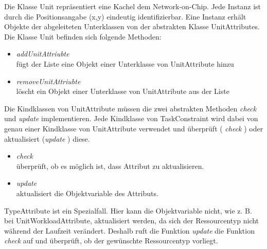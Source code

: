 Die Klasse Unit repräsentiert eine Kachel dem Network-on-Chip. Jede Instanz ist durch die Positionsangabe (x,y) eindeutig identifizierbar. Eine Instanz erhält Objekte der abgeleiteten Unterklassen von der abstrakten Klasse UnitAttributes. Die Klasse Unit befinden sich folgende Methoden:
\begin{itemize}
\item \textit{addUnitAttriubte}\\
fügt der Liste eine Objekt einer Unterklasse von UnitAttribute hinzu
\item \textit{removeUnitAttriubte}\\
löscht ein Objekt einer Unterklasse von UnitAttribute aus der Liste
\end{itemize}

Die Kindklassen von UnitAttribute müssen die zwei abstrakten Methoden \textit{check} und \textit{update} implementieren. Jede Kindklasse von TaskConstraint wird dabei von genau einer Kindklasse von UnitAttribute verwendet und überprüft ( \textit{check} ) oder aktualisiert (\textit{update} ) diese.

\begin{itemize}
\item \textit{check}\\
überprüft, ob es möglich ist, dass Attribut zu aktualisieren.
\item \textit{update} \\
aktualisiert die Objektvariable des Attributs.
\end{itemize}


TypeAttribute ist ein Spezialfall. Hier kann die Objektvariable nicht, wie z. B. bei UnitWorkloadAttribute, aktualisiert werden, da sich der Ressourcentyp  nicht während der Laufzeit verändert. Deshalb ruft die Funktion \textit{update} die Funktion \textit{check} auf und überprüft, ob der gewünschte Ressourcentyp vorliegt.



